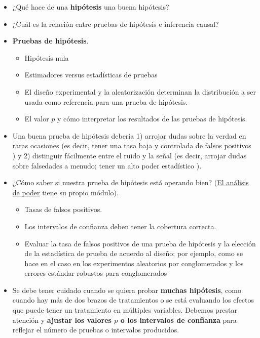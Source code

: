 \documentclass[
  12pt,
  spanish,
]{book}
\begin{document}
\begin{itemize}
\item
  ¿Qué hace de una \textbf{hipótesis} una buena hipótesis?
\item
  ¿Cuál es la relación entre pruebas de hipótesis e inferencia causal?
\item
  \textbf{Pruebas de hipótesis}.

  \begin{itemize}
  \item
    Hipótesis nula
  \item
    Estimadores versus estadísticas de pruebas
  \item
    El diseño experimental y la aleatorización determinan la distribución a ser usada como referencia para una prueba de hipótesis.
  \item
    El valor \(p\) y cómo interpretar los resultados de las pruebas de hipótesis.
  \end{itemize}
\item
  Una buena prueba de hipótesis debería 1) arrojar dudas sobre la verdad en raras ocasiones (es decir, tener una tasa baja y controlada de falsos positivos ) y 2) distinguir fácilmente entre el ruido y la señal (es decir, arrojar dudas sobre falsedades a menudo; tener un alto poder estadístico ).
\item
  ¿Cómo saber si nuestra prueba de hipótesis está operando bien? (\href{poder-estadístico-y-diagnosticandos-del-diseño.html}{El análisis de poder} tiene su propio módulo).

  \begin{itemize}
  \item
    Tasas de falsos positivos.
  \item
    Los intervalos de confianza deben tener la cobertura correcta.
  \item
    Evaluar la tasa de falsos positivos de una prueba de hipótesis y la elección de la estadística de prueba de acuerdo al diseño; por ejemplo, como se hace en el caso en los experimentos aleatorios por conglomerados y los errores estándar robustos para conglomerados
  \end{itemize}
\item
  Se debe tener cuidado cuando se quiera probar \textbf{muchas hipótesis}, como cuando hay más de dos brazos de tratamientos o se está evaluando los efectos que puede tener un tratamiento en múltiples variables. Debemos prestar atención y \textbf{ajustar los valores \(p\) o los intervalos de confianza} para reflejar el número de pruebas o intervalos producidos.
\end{itemize}
\end{document}

